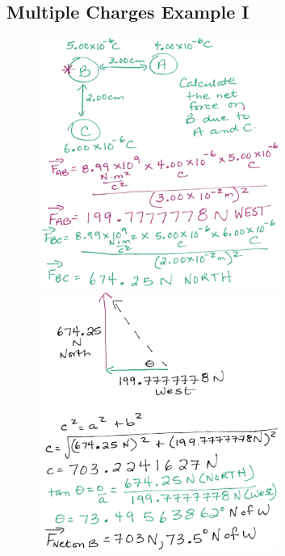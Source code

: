 \documentclass[a4paper,12pt]{article}
\begin{document}
\subsection{Multiple Charges Example I}
\begin{figure}[H]
    \centering
    \includegraphics[width=0.7\textwidth]{multiple}
    \includegraphics[width=0.7\textwidth]{multiple2}
\end{figure}
\end{document}
